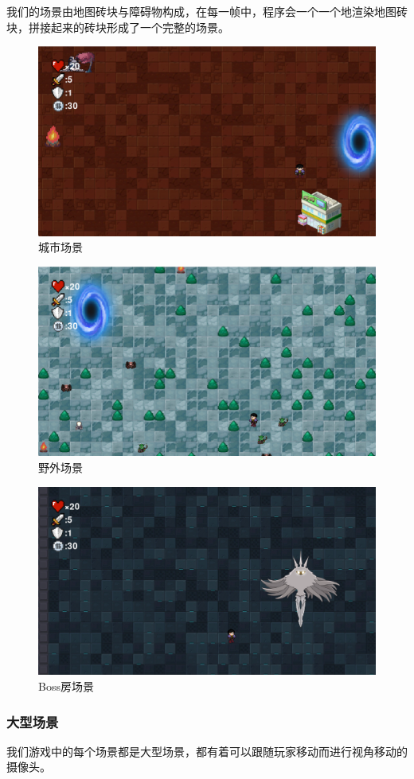 \documentclass{ctexart}
\begin{document}
我们的场景由地图砖块与障碍物构成，在每一帧中，程序会一个一个地渲染地图砖块，拼接起来的砖块形成了一个完整的场景。
\begin{figure}
\centering
\includegraphics[width=0.7\linewidth]{场景1.png}
\caption{\label{fig:场景1}城市场景}
\end{figure}
\begin{figure}
\centering
\includegraphics[width=0.7\linewidth]{场景2.png}
\caption{\label{fig:场景2}野外场景}
\end{figure}
\begin{figure}
\centering
\includegraphics[width=0.7\linewidth]{场景3.png}
\caption{\label{fig:场景3}Boss房场景}
\end{figure}

\subsubsection{大型场景}
我们游戏中的每个场景都是大型场景，都有着可以跟随玩家移动而进行视角移动的摄像头。
\end{document}
